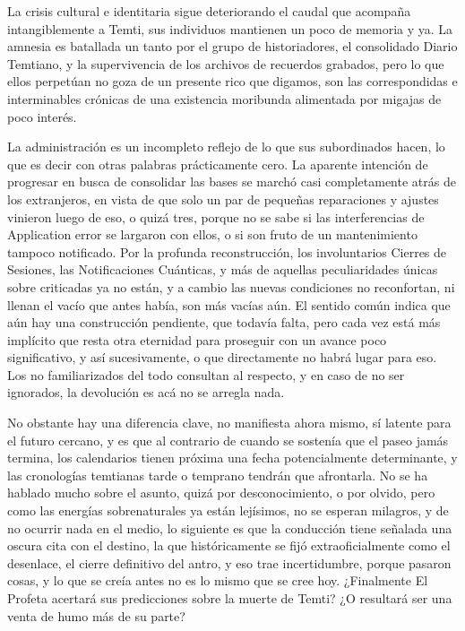 \documentclass[
]{book}
\begin{document}
La crisis cultural e identitaria sigue deteriorando el caudal que acompaña intangiblemente a Temti, sus individuos mantienen un poco de memoria y ya. La amnesia es batallada un tanto por el grupo de historiadores, el consolidado Diario Temtiano, y la supervivencia de los archivos de recuerdos grabados, pero lo que ellos perpetúan no goza de un presente rico que digamos, son las correspondidas e interminables crónicas de una existencia moribunda alimentada por migajas de poco interés.

La administración es un incompleto reflejo de lo que sus subordinados hacen, lo que es decir con otras palabras prácticamente cero. La aparente intención de progresar en busca de consolidar las bases se marchó casi completamente atrás de los extranjeros, en vista de que solo un par de pequeñas reparaciones y ajustes vinieron luego de eso, o quizá tres, porque no se sabe si las interferencias de Application error se largaron con ellos, o si son fruto de un mantenimiento tampoco notificado. Por la profunda reconstrucción, los involuntarios Cierres de Sesiones, las Notificaciones Cuánticas, y más de aquellas peculiaridades únicas sobre criticadas ya no están, y a cambio las nuevas condiciones no reconfortan, ni llenan el vacío que antes había, son más vacías aún. El sentido común indica que aún hay una construcción pendiente, que todavía falta, pero cada vez está más implícito que resta otra eternidad para proseguir con un avance poco significativo, y así sucesivamente, o que directamente no habrá lugar para eso. Los no familiarizados del todo consultan al respecto, y en caso de no ser ignorados, la devolución es acá no se arregla nada.

No obstante hay una diferencia clave, no manifiesta ahora mismo, sí latente para el futuro cercano, y es que al contrario de cuando se sostenía que el paseo jamás termina, los calendarios tienen próxima una fecha potencialmente determinante, y las cronologías temtianas tarde o temprano tendrán que afrontarla. No se ha hablado mucho sobre el asunto, quizá por desconocimiento, o por olvido, pero como las energías sobrenaturales ya están lejísimos, no se esperan milagros, y de no ocurrir nada en el medio, lo siguiente es que la conducción tiene señalada una oscura cita con el destino, la que históricamente se fijó extraoficialmente como el desenlace, el cierre definitivo del antro, y eso trae incertidumbre, porque pasaron cosas, y lo que se creía antes no es lo mismo que se cree hoy. ¿Finalmente El Profeta acertará sus predicciones sobre la muerte de Temti? ¿O resultará ser una venta de humo más de su parte?
\end{document}
